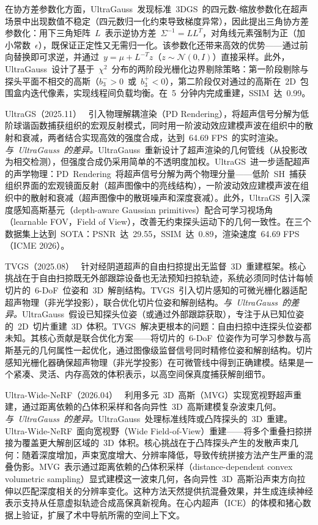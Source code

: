 在协方差参数化方面，UltraGauss~发现标准~3DGS~的四元数-缩放参数化在超声场景中出现数值不稳定（四元数归一化约束导致梯度异常），因此提出三角协方差参数化：用下三角矩阵~$L$~表示逆协方差~$\Sigma^{-1} = LL^T$，对角线元素强制为正（加小常数~$\epsilon$），既保证正定性又无需归一化。该参数化还带来高效的优势——通过前向替换即可求逆，并通过~$y = \mu + L^{-T}z$（$z \sim \mathcal{N}(0, I)$）直接采样。此外，UltraGauss~设计了基于~$\chi^2$~分布的两阶段光栅化边界剔除策略：第一阶段剔除与探头平面不相交的高斯（$b_3^- > 0$~或~$b_3^+ < 0$），第二阶段仅对通过的高斯在~2D~包围盒内迭代像素，实现线程间负载均衡。在~5~分钟内完成重建，SSIM~达~0.99。

UltraGS（2025.11）~\cite{2511_07743} 引入物理解耦渲染（PD Rendering），将超声信号分解为低阶球谐函数捕获组织的宏观反射模式，同时用一阶波动效应建模声波在组织中的散射和衰减，两者结合实现高效的强度合成，达到~64.69 FPS~的实时渲染。\textit{与~UltraGauss~的差异。}UltraGauss~重新设计了超声渲染的几何管线（从投影改为相交检测），但强度合成仍采用简单的不透明度加权。UltraGS~进一步适配超声的声学物理：PD~Rendering~将超声信号分解为两个物理分量——低阶~SH~捕获组织界面的宏观镜面反射（超声图像中的亮线结构），一阶波动效应建模声波在组织中的散射和衰减（超声图像中的散斑噪声和深度衰减）。此外，UltraGS~引入深度感知高斯基元（depth-aware Gaussian primitives）配合可学习视场角（learnable FOV，Field of View），改善无约束探头运动下的几何一致性。在三个数据集上达到~SOTA：PSNR~达~29.55，SSIM~达~0.89，渲染速度~64.69 FPS（ICME 2026）。

TVGS（2025.08）~\cite{2508_14552} 针对经阴道超声的自由扫掠提出无监督~3D~重建框架。核心挑战在于自由扫掠既无外部跟踪设备也无法预知扫掠轨迹，系统必须同时估计每帧切片的~6-DoF~位姿和~3D~解剖结构。TVGS~引入切片感知的可微光栅化器适配超声物理（非光学投影），联合优化切片位姿和解剖结构。\textit{与~UltraGauss~的差异。}UltraGauss~假设已知探头位姿（或通过外部跟踪获取），专注于从已知位姿的~2D~切片重建~3D~体积。TVGS~解决更根本的问题：自由扫掠中连探头位姿都未知。其核心贡献是联合优化方案——将切片的~6-DoF~位姿作为可学习参数与高斯基元的几何属性一起优化，通过图像级监督信号同时精修位姿和解剖结构。切片感知光栅化器确保超声物理（非光学投影）在可微管线中得到正确建模。结果是一个紧凑、灵活、内存高效的体积表示，以高空间保真度捕获解剖细节。

Ultra-Wide-NeRF（2026.04）~\cite{2604_24187} 利用多元~3D~高斯（MVG）实现宽视野超声重建，通过距离依赖的凸体积采样和各向异性~3D~高斯建模复杂波束几何。\textit{与~UltraGauss~的差异。}UltraGauss~处理标准线阵或凸阵探头的~3D~重建。Ultra-Wide-NeRF~面向宽视野（Wide Field-of-View）重建——将多个重叠扫掠拼接为覆盖更大解剖区域的~3D~体积。核心挑战在于凸阵探头产生的发散声束几何：随着深度增加，声束宽度增大、分辨率降低，导致传统拼接方法产生严重的混叠伪影。MVG~表示通过距离依赖的凸体积采样（distance-dependent convex volumetric sampling）显式建模这一波束几何，各向异性~3D~高斯沿声束方向拉伸以匹配深度相关的分辨率变化。这种方法天然提供抗混叠效果，并生成连续神经表示支持从任意虚拟轨迹合成高保真新视角。在心内超声（ICE）的体模和猪心数据上验证，扩展了术中导航所需的空间上下文。


